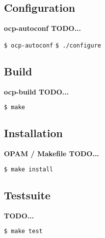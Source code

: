\subsection{Configuration}
{\bf ocp-autoconf TODO...}

{\tt \$ ocp-autoconf}
{\tt \$ ./configure}

\subsection{Build}
{\bf ocp-build TODO...}

{\tt \$ make}

\subsection{Installation}
{\bf OPAM / Makefile TODO...}

{\tt \$ make install}

\subsection{Testsuite}
{\bf TODO...}

{\tt \$ make test}